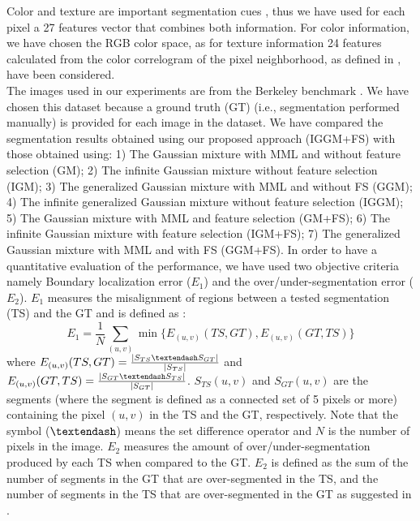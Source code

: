 \documentclass[journal,10pt]{elsart}
\begin{document}
Color and texture are important segmentation cues \cite{Konishi2000,Elgammal2000}, thus we have used for each pixel a 27 features vector that combines both information. For color information, we have chosen the RGB color space, as for texture information 24 features calculated from the color correlogram of the pixel neighborhood, as defined in \cite{Allili2007}, have been considered.\\
The images used in our experiments are from the Berkeley benchmark \cite{Martin2001}. We have chosen this dataset because a ground truth (GT) (i.e., segmentation performed manually) is provided for each image in the dataset. We have compared the segmentation results obtained using our proposed approach (IGGM+FS) with those obtained using: 1) The Gaussian mixture with MML and without feature selection (GM); 2) The infinite Gaussian mixture without feature selection (IGM); 3) The generalized Gaussian mixture with MML and without FS (GGM); 4) The infinite generalized Gaussian mixture without feature selection (IGGM); 5) The Gaussian mixture with MML and feature selection (GM+FS); 6) The infinite Gaussian mixture with feature selection (IGM+FS); 7) The generalized Gaussian mixture with MML and with FS (GGM+FS). In order to have a quantitative evaluation of the performance, we have used two objective criteria namely Boundary localization error ($E_1$) and the over/under-segmentation error ($E_2$). $E_1$ measures the misalignment of regions between a tested segmentation (TS) and the GT and is defined as \cite{Martin2001}:
\begin{equation}\label{firsterror}
E_1 = \frac{1}{N} \sum_{(u,v)} \min \{E_{(u,v)}(TS,GT), E_{(u,v)}(GT,TS)\}
\end{equation}
where $E_{(u,v)}(TS,GT) = \frac {|S_{TS} \textendash S_{GT}|}{|S_{TS}|}$ and $E_{(u,v)}(GT,TS) = \frac {|S_{GT} \textendash S_{TS}|}{|S_{GT}|}$. $S_{TS}(u, v)$ and $S_{GT}(u, v)$ are the segments (where the segment is defined as a connected set of 5 pixels or more) containing the pixel $(u,v)$ in the TS and the GT, respectively. Note that the symbol ($\textendash$) means the set difference operator and $N$ is the number of pixels in the image. $E_2$ measures the amount of over/under-segmentation produced by each TS when compared to the GT. $E_2$ is defined as the sum of the number of segments in the GT that are over-segmented in the TS, and the number of segments in the TS that are over-segmented in the GT as suggested in \cite{Allili2007}.
\end{document}
